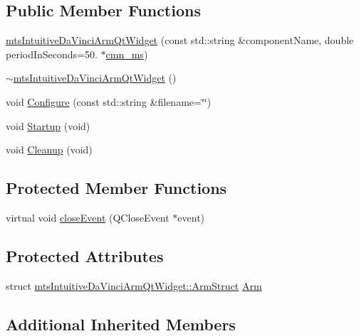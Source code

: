 \subsection*{Public Member Functions}
\begin{DoxyCompactItemize}
\item 
\hyperlink{classmts_intuitive_da_vinci_arm_qt_widget_a7e774607fa791454a8e436937404a1ec}{mts\+Intuitive\+Da\+Vinci\+Arm\+Qt\+Widget} (const std\+::string \&component\+Name, double period\+In\+Seconds=50. $\ast$\hyperlink{cmn_units_8h_aaf4d3f2fafb9b4a95606544b9d876b4a}{cmn\+\_\+ms})
\item 
\hyperlink{classmts_intuitive_da_vinci_arm_qt_widget_a3bdf073035b4abc7b533f66a073bfc50}{$\sim$mts\+Intuitive\+Da\+Vinci\+Arm\+Qt\+Widget} ()
\item 
void \hyperlink{classmts_intuitive_da_vinci_arm_qt_widget_ad8228e228cddf61ac848b5799785fb23}{Configure} (const std\+::string \&filename=\char`\"{}\char`\"{})
\item 
void \hyperlink{classmts_intuitive_da_vinci_arm_qt_widget_a650fc8e658ab975458072974e77b46f9}{Startup} (void)
\item 
void \hyperlink{classmts_intuitive_da_vinci_arm_qt_widget_ad8d66f1c511581101f3fb1512bbd6d2b}{Cleanup} (void)
\end{DoxyCompactItemize}
\subsection*{Protected Member Functions}
\begin{DoxyCompactItemize}
\item 
virtual void \hyperlink{classmts_intuitive_da_vinci_arm_qt_widget_aab5e40c10f4f3164ab37344ef2ab0058}{close\+Event} (Q\+Close\+Event $\ast$event)
\end{DoxyCompactItemize}
\subsection*{Protected Attributes}
\begin{DoxyCompactItemize}
\item 
struct \hyperlink{structmts_intuitive_da_vinci_arm_qt_widget_1_1_arm_struct}{mts\+Intuitive\+Da\+Vinci\+Arm\+Qt\+Widget\+::\+Arm\+Struct} \hyperlink{classmts_intuitive_da_vinci_arm_qt_widget_adbbfb1dbfa27d6f5ec694c4e93a710d0}{Arm}
\end{DoxyCompactItemize}
\subsection*{Additional Inherited Members}


